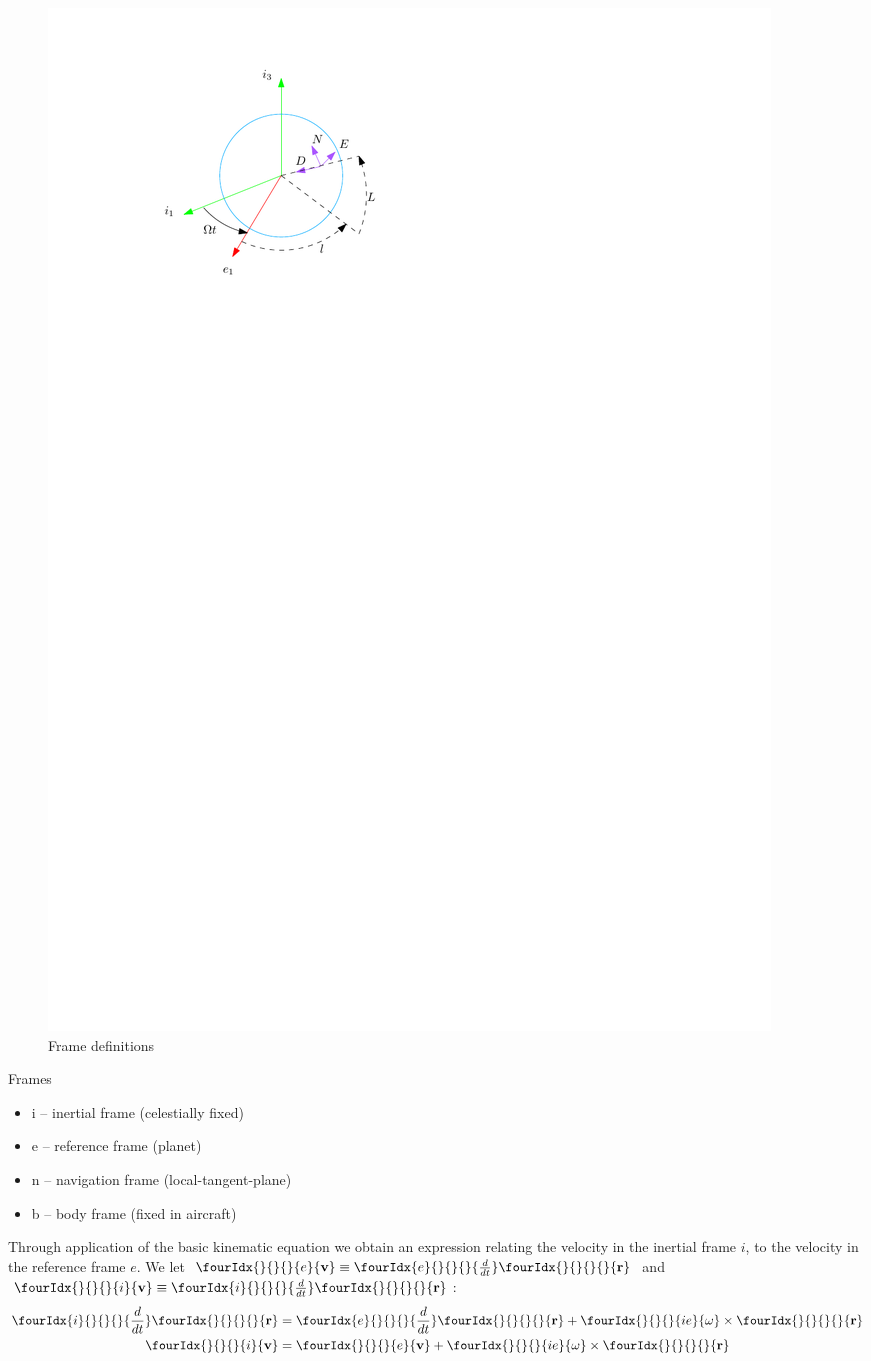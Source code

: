 \documentclass[10pt,letterpaper]{article}
\newcommand{\ddt}[1]{\fourIdx{#1}{}{}{}{\frac{d}{dt}}}
\newcommand{\vect}[3]{\fourIdx{}{}{#3}{#2}{\mathbf{#1}}}
\newcommand{\cross}[0]{\times}
\newcommand{\wie}[0]{\vect{\omega}{ie}{}}
\newcommand{\ve}[0]{\vect{v}{e}{}}
\newcommand{\vi}[0]{\vect{v}{i}{}}
\newcommand{\rv}[0]{\vect{r}{}{}}
\begin{document}
\begin{figure}[ht!]
\center
\includegraphics[scale=1]{fig/frames.pdf} 
\caption{Frame definitions}
\end{figure}

Frames
\begin{itemize}
\item i -- inertial frame (celestially fixed)
\item e -- reference frame (planet)
\item n -- navigation frame (local-tangent-plane)
\item b -- body frame (fixed in aircraft)
\end{itemize}

Through application of the basic kinematic equation we obtain an expression relating the velocity in the inertial frame $i$, to the velocity in the reference frame $e$. We let $\ve \equiv \ddt{e} \rv$ and
$\vi \equiv \ddt{i} \rv$:
\begin{align}
\ddt{i}\rv &= \ddt{e} \rv + \wie \cross \rv \notag \\
\vi &= \ve + \wie \cross \rv
\label{eq:ve}
\end{align}
\end{document}
